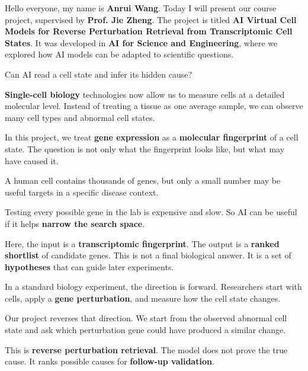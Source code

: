 \documentclass[10pt]{article}
\newcommand{\slidetitle}[1]{\vspace{0.22em}\noindent{\normalsize\textbf{#1}}\par\vspace{-0.04em}}
\begin{document}
\fontsize{11.2}{13.55}\selectfont

\par
\vspace{0.3em}

Hello everyone, my name is \textbf{Anrui Wang}. Today I will present our course project, supervised by \textbf{Prof. Jie Zheng}. The project is titled \textbf{AI Virtual Cell Models for Reverse Perturbation Retrieval from Transcriptomic Cell States}. It was developed in \textbf{AI for Science and Engineering}, where we explored how AI models can be adapted to scientific questions.

\slidetitle{Slide 1}

Can AI read a cell state and infer its hidden cause?

\textbf{Single-cell biology} technologies now allow us to measure cells at a detailed molecular level. Instead of treating a tissue as one average sample, we can observe many cell types and abnormal cell states.

In this project, we treat \textbf{gene expression} as a \textbf{molecular fingerprint} of a cell state. The question is not only what the fingerprint looks like, but what may have caused it.

\slidetitle{Slide 2}

A human cell contains thousands of genes, but only a small number may be useful targets in a specific disease context.

Testing every possible gene in the lab is expensive and slow. So AI can be useful if it helps \textbf{narrow the search space}.

Here, the input is a \textbf{transcriptomic fingerprint}. The output is a \textbf{ranked shortlist} of candidate genes. This is not a final biological answer. It is a set of \textbf{hypotheses} that can guide later experiments.

\slidetitle{Slide 3}

In a standard biology experiment, the direction is forward. Researchers start with cells, apply a \textbf{gene perturbation}, and measure how the cell state changes.

Our project reverses that direction. We start from the observed abnormal cell state and ask which perturbation gene could have produced a similar change.

This is \textbf{reverse perturbation retrieval}. The model does not prove the true cause. It ranks possible causes for \textbf{follow-up validation}.
\end{document}
